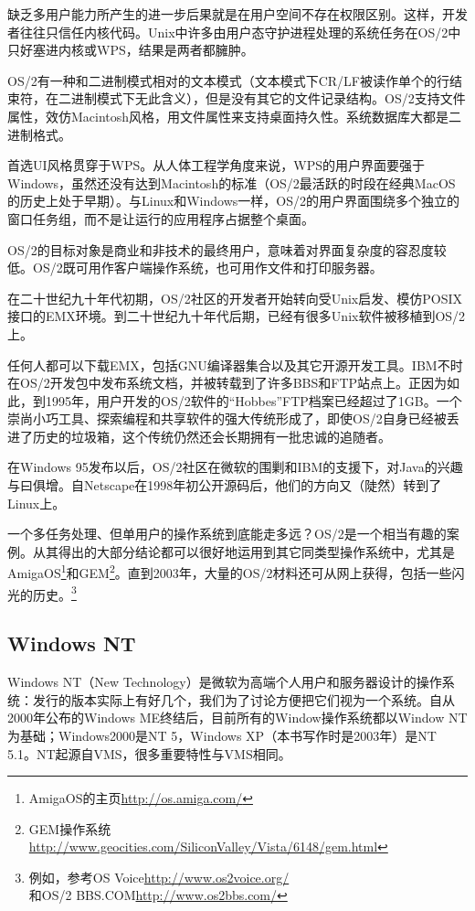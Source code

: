 \documentclass[12pt,oneside]{book}
\begin{document}
\begin{common-format}
缺乏多用户能力所产生的进一步后果就是在用户空间不存在权限区别。这样，开发者往往只信任内核代码。Unix中许多由用户态守护进程处理的系统任务在OS/2中只好塞进内核或WPS，结果是两者都臃肿。

OS/2有一种和二进制模式相对的文本模式（文本模式下CR/LF被读作单个的行结束符，在二进制模式下无此含义），但是没有其它的文件记录结构。OS/2支持文件属性，效仿Macintosh风格，用文件属性来支持桌面持久性。系统数据库大都是二进制格式。

首选UI风格贯穿于WPS。从人体工程学角度来说，WPS的用户界面要强于Windows，虽然还没有达到Macintosh的标准（OS/2最活跃的时段在经典MacOS的历史上处于早期）。与Linux和Windows一样，OS/2的用户界面围绕多个独立的窗口任务组，而不是让运行的应用程序占据整个桌面。

OS/2的目标对象是商业和非技术的最终用户，意味着对界面复杂度的容忍度较低。OS/2既可用作客户端操作系统，也可用作文件和打印服务器。

在二十世纪九十年代初期，OS/2社区的开发者开始转向受Unix启发、模仿POSIX接口的EMX环境。到二十世纪九十年代后期，已经有很多Unix软件被移植到OS/2上。

任何人都可以下载EMX，包括GNU编译器集合以及其它开源开发工具。IBM不时在OS/2开发包中发布系统文档，并被转载到了许多BBS和FTP站点上。正因为如此，到1995年，用户开发的OS/2软件的“Hobbes”FTP档案已经超过了1GB。一个崇尚小巧工具、探索编程和共享软件的强大传统形成了，即使OS/2自身已经被丢进了历史的垃圾箱，这个传统仍然还会长期拥有一批忠诚的追随者。

在Windows 95发布以后，OS/2社区在微软的围剿和IBM的支援下，对Java的兴趣与曰俱增。自Netscape在1998年初公开源码后，他们的方向又（陡然）转到了Linux上。

一个多任务处理、但单用户的操作系统到底能走多远？OS/2是一个相当有趣的案例。从其得出的大部分结论都可以很好地运用到其它同类型操作系统中，尤其是AmigaOS\footnote{AmigaOS的主页\href{http://os.amiga.com/}{http://os.amiga.com/}}和GEM\footnote{GEM操作系统\\ \href{http://www.geocities.com/SiliconValley/Vista/6148/gem.html}{http://www.geocities.com/SiliconValley/Vista/6148/gem.html}}。直到2003年，大量的OS/2材料还可从网上获得，包括一些闪光的历史。\footnote{例如，参考OS Voice\href{http://www.os2voice.org/}{http://www.os2voice.org/}\\和OS/2 BBS.COM\href{http://www.os2bbs.com/}{http://www.os2bbs.com/}}


\subsection{Windows NT}
Windows NT（New Technology）是微软为高端个人用户和服务器设计的操作系统：发行的版本实际上有好几个，我们为了讨论方便把它们视为一个系统。自从2000年公布的Windows ME终结后，目前所有的Window操作系统都以Window NT为基础；Windows2000是NT 5，Windows XP（本书写作时是2003年）是NT 5.1。NT起源自VMS，很多重要特性与VMS相同。


\end{common-format}
\end{document}
